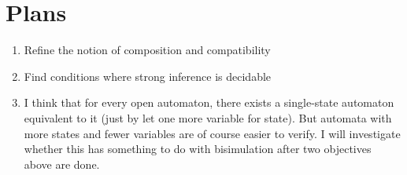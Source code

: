 \section{Plans}

\begin{enumerate}
  \item Refine the notion of composition and compatibility
  \item Find conditions where strong inference is decidable
  \item I think that for every open automaton, there exists a single-state automaton equivalent to it (just by let one more variable for state). But automata with more states and fewer variables are of course easier to verify. I will investigate whether this has something to do with bisimulation after two objectives above are done.
\end{enumerate}

